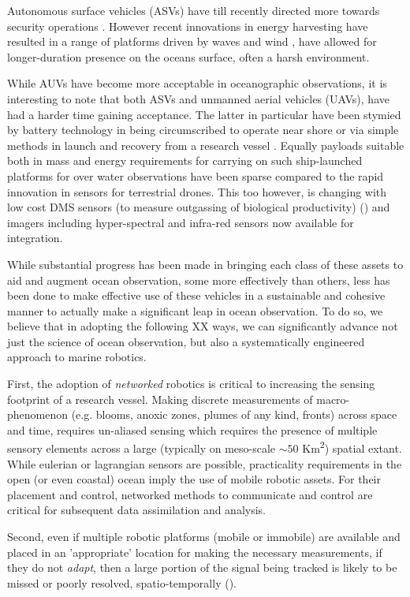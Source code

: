 \documentclass[12pt]{article}
\begin{document}
Autonomous surface vehicles (ASVs) have till recently directed more
towards security operations \cite{wolf10}. However recent innovations
in energy harvesting have resulted in a range of platforms driven by
waves \cite{waveglider,verfuss19} and wind \cite{gentemann20,ghani14},
have allowed for longer-duration presence on the oceans surface, often
a harsh environment.

While AUVs have become more acceptable in oceanographic observations,
it is interesting to note that both ASVs and unmanned aerial vehicles
(UAVs), have had a harder time gaining acceptance. The latter in
particular have been stymied by battery technology in being
circumscribed to operate near shore or via simple methods in launch
and recovery from a research vessel \cite{Ferreira2018}. Equally
payloads suitable both in mass and energy requirements for carrying on
such ship-launched platforms for over water observations have been
sparse compared to the rapid innovation in sensors for terrestrial
drones. This too however, is changing with low cost DMS sensors (to
measure outgassing of biological productivity) () and imagers
including hyper-spectral \cite{sigernes18} and infra-red sensors now
available for integration.

While substantial progress has been made in bringing each class of
these assets to aid and augment ocean observation, some more
effectively than others, less has been done to make effective use of
these vehicles in a sustainable and cohesive manner to actually make a
significant leap in ocean observation. To do so, we believe that in
adopting the following XX ways, we can significantly advance not just
the science of ocean observation, but also a systematically engineered
approach to marine robotics. 

First, the adoption of \emph{networked} robotics is critical to
increasing the sensing footprint of a research vessel. Making discrete
measurements of macro-phenomenon (e.g. blooms, anoxic zones, plumes of
any kind, fronts) across space and time, requires un-aliased sensing
which requires the presence of multiple sensory elements across a
large (typically on meso-scale $\sim 50$ Km\textsuperscript{2})
spatial extant. While eulerian or lagrangian sensors are possible,
practicality requirements in the open (or even coastal) ocean imply
the use of mobile robotic assets. For their placement and control,
networked methods to communicate and control are critical for
subsequent data assimilation and analysis.

Second, even if multiple robotic platforms (mobile or immobile) are
available and placed in an 'appropriate' location for making the
necessary measurements, if they do not \emph{adapt}, then a large
portion of the signal being tracked is likely to be missed or poorly
resolved, spatio-temporally ().
\end{document}
